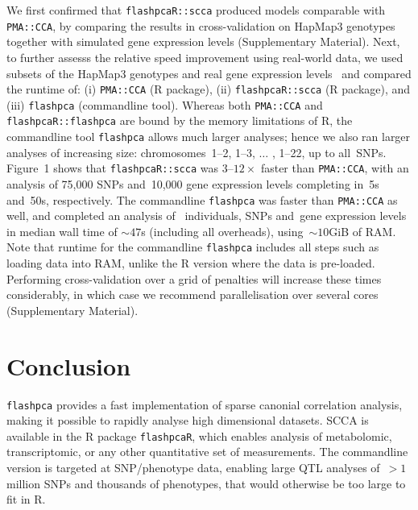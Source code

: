 \documentclass{bioinfo}
\begin{document}
We first confirmed that \texttt{flashpcaR::scca} produced models comparable
with \texttt{PMA::CCA}, by comparing the results in cross-validation on HapMap3
genotypes together with simulated gene expression levels (Supplementary
Material).  Next, to further assesss the relative speed improvement using
real-world data, we used subsets of the HapMap3 genotypes and real gene
expression levels~\citep{Stranger2012} and compared the runtime of: (i)
\texttt{PMA::CCA} (\textsf{R} package), (ii) \texttt{flashpcaR::scca}
(\textsf{R} package), and (iii) \texttt{flashpca} (commandline tool).
Whereas both \texttt{PMA::CCA} and \texttt{flashpcaR::flashpca} are bound by
the memory limitations of \textsf{R}, the commandline tool \texttt{flashpca}
allows much larger analyses; hence we also ran larger analyses of increasing
size: chromosomes~1--2, 1--3, $\hdots$ , 1--22, up to all~\nsnps SNPs.
Figure~1\vphantom{\ref{fig:01}} shows that \texttt{flashpcaR::scca} was
$3\text{--}12\times$ faster than \texttt{PMA::CCA}, with an analysis
of 75,000 SNPs and~10,000 gene expression levels completing in~5s
and~50s, respectively. The commandline \texttt{flashpca} was faster
than \texttt{PMA::CCA} as well, and completed an analysis of~\nindiv
individuals, \nsnps SNPs and~\ngenes gene expression levels in median wall
time of ${\sim}47$s (including all overheads), using~${\sim}10$GiB of RAM.
Note that runtime for the commandline \texttt{flashpca} includes all steps
such as loading data into RAM, unlike the \textsf{R} version where the data
is pre-loaded.  Performing cross-validation over a grid of penalties will
increase these times considerably, in which case we recommend parallelisation
over several cores (Supplementary Material).\vspace*{-12pt}

\section{Conclusion}

\texttt{flashpca} provides a fast implementation of sparse canonial correlation
analysis, making it possible to rapidly analyse high dimensional datasets.
SCCA is available in the \textsf{R} package \texttt{flashpcaR}, which enables
analysis of metabolomic, transcriptomic, or any other quantitative set of
measurements. The commandline version is targeted at SNP/phenotype data,
enabling large QTL analyses of~${>}1$ million SNPs and thousands of phenotypes,
that would otherwise be too large to fit in \textsf{R}.\vspace*{-12pt}
\end{document}
